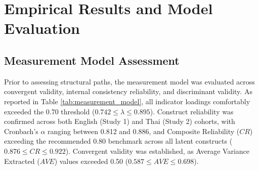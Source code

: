 \section{Empirical Results and Model Evaluation}
\label{sec:results}

\subsection{Measurement Model Assessment}
Prior to assessing structural paths, the measurement model was evaluated across convergent validity, internal consistency reliability, and discriminant validity. As reported in Table \ref{tab:measurement_model}, all indicator loadings comfortably exceeded the 0.70 threshold ($0.742 \le \lambda \le 0.895$). Construct reliability was confirmed across both English (Study 1) and Thai (Study 2) cohorts, with Cronbach's $\alpha$ ranging between 0.812 and 0.886, and Composite Reliability ($CR$) exceeding the recommended 0.80 benchmark across all latent constructs ($0.876 \le CR \le 0.922$). Convergent validity was established, as Average Variance Extracted ($AVE$) values exceeded 0.50 ($0.587 \le AVE \le 0.698$).

